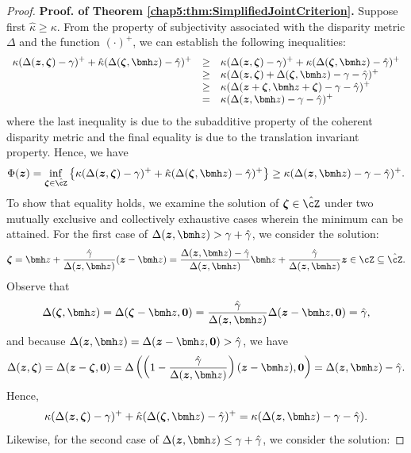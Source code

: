 \documentclass[mnsc, nonblindrev]{informswp}
\newcommand{\1}[1]{\mathds{1}{\left(#1\right)}}
\begin{document}
\begin{appendices}
\begin{proof}{\bf Proof. of Theorem \ref{chap5:thm:SimplifiedJointCriterion}.}
Suppose first $\hat \kappa \geq \kappa$. From the property of subjectivity associated with the disparity metric $\Delta$ and the function $(\cdot)^+$, we can establish the following inequalities:
$$
\begin{array}{rcl}
\displaystyle \kappa (  \Delta(\bm z,\bm \zeta) - \gamma)^+ + \hat \kappa ( \Delta(\bm \zeta,\bmh z) - \hat \gamma)^+ 
&\geq&  \displaystyle \kappa (  \Delta(\bm z,\bm \zeta) - \gamma)^+ +  \kappa ( \Delta(\bm \zeta,\bmh z) - \hat \gamma)^+\\
&\geq&  \displaystyle \kappa ( \Delta(\bm z,\bm \zeta) + \Delta(\bm \zeta,\bmh z) - \gamma - \hat \gamma)^+ \\
&\geq&  \displaystyle \kappa ( \Delta(\bm z+\bm \zeta,\bmh z+ \bm \zeta) - \gamma - \hat \gamma)^+ \\
&=&  \displaystyle \kappa ( \Delta(\bm{z},\bmh z) - \gamma - \hat \gamma)^+ 
\end{array}
$$
where the last inequality is due to the subadditive property of the coherent disparity metric and the final equality is due to the translation invariant property. Hence, we have 
$$
\Phi(\bm z) = \inf_{\bm \zeta  \in  \hat \cZ} \left\{ \kappa (  \Delta(\bm z,\bm \zeta) - \gamma)^+ + \hat \kappa ( \Delta(\bm \zeta,\bmh z) - \hat \gamma)^+ \right\} \geq  \kappa( \Delta(\bm z,\bmh z) - \gamma -\hat \gamma)^+.
$$
To show that equality holds, we examine the solution of $\bm \zeta  \in  \hat \cZ$ under two mutually exclusive and collectively exhaustive cases wherein the minimum can be attained. For the first case of $\Delta(\bm z,\bmh z)> \gamma + \hat \gamma$, we consider the solution:
$$
\bm \zeta = \bmh z + \frac{\hat \gamma}{\Delta(\bm z,\bmh z)}(\bm z - \bmh z) = \frac{\Delta(\bm z,\bmh z) - \hat \gamma}{\Delta(\bm z,\bmh z)}\bmh z +  \frac{\hat \gamma}{\Delta(\bm z,\bmh z)}\bm z \in \cZ \subseteq \hat \cZ. 
$$
Observe that 
$$
\Delta(\bm \zeta,\bmh z) = \Delta(\bm \zeta-\bmh z,\bm 0) = \frac{\hat \gamma}{\Delta(\bm z,\bmh z)}  \Delta(\bm z-\bmh z,\bm 0) =  \hat \gamma,
$$
and because $\Delta(\bm z,\bmh z)=\Delta(\bm z-\bmh z,\bm 0)> \hat \gamma$, we have 
$$
\Delta(\bm z,\bm \zeta)= \Delta(\bm z - \bm \zeta, \bm 0) = \Delta\left( \left( 1- \frac{\hat \gamma}{\Delta(\bm z,\bmh z)}\right)(\bm z - \bmh z),\bm 0\right) = \Delta(\bm z,\bmh z) - \hat \gamma.
$$
Hence,
$$
\kappa (  \Delta(\bm z,\bm \zeta) - \gamma)^+ + \hat \kappa ( \Delta(\bm \zeta,\bmh z) - \hat \gamma)^+ =  \kappa( \Delta(\bm z,\bmh z) - \gamma -\hat \gamma). 
$$
Likewise, for the second case of $\Delta(\bm z,\bmh z)\leq \gamma + \hat \gamma$, we consider the solution:

\end{proof}
\end{appendices}
\end{document}
